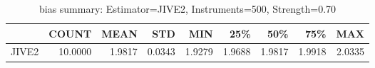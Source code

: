 \begin{table}[ht]
\centering
\caption{bias summary: Estimator=JIVE2, Instruments=500, Strength=0.70}
\begin{tabular}{lrrrrrrrr}
\toprule
 & COUNT & MEAN & STD & MIN & 25\% & 50\% & 75\% & MAX \\
\midrule
JIVE2 & 10.0000 & 1.9817 & 0.0343 & 1.9279 & 1.9688 & 1.9817 & 1.9918 & 2.0335 \\
\bottomrule
\end{tabular}
\end{table}
